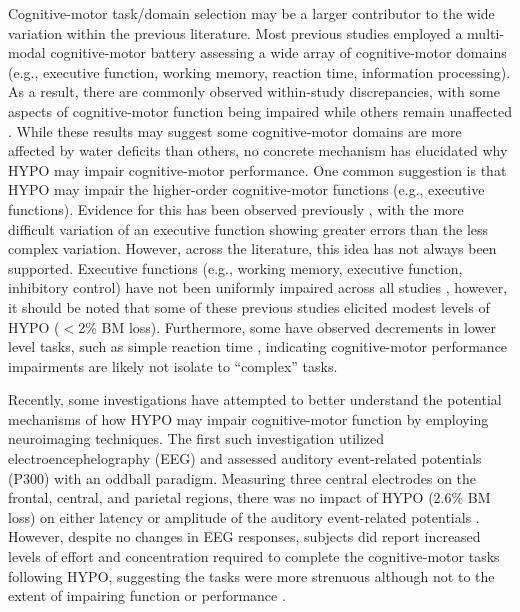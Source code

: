 Cognitive-motor task/domain selection may be a larger contributor to the wide variation within the previous literature. Most previous studies employed a multi-modal cognitive-motor battery assessing a wide array of cognitive-motor domains (e.g., executive function, working memory, reaction time, information processing). As a result, there are commonly observed within-study discrepancies, with some aspects of cognitive-motor function being impaired while others remain unaffected \cite{ganio_mild_2011}. While these results may suggest some cognitive-motor domains are more affected by water deficits than others, no concrete mechanism has elucidated why HYPO may impair cognitive-motor performance. One common suggestion is that HYPO may impair the higher-order cognitive-motor functions (e.g., executive functions). Evidence for this has been observed previously \cite{tomporowski_effects_2007}, with the more difficult variation of an executive function showing greater errors than the less complex variation. However, across the literature, this idea has not always been supported. Executive functions (e.g., working memory, executive function, inhibitory control) have not been uniformly impaired across all studies \cite{wittbrodt_exercise-induced_2015,armstrong_mild_2012,danci_voluntary_2009,kakos_improving_2013,turner_mild_2017}, however, it should be noted that some of these previous studies elicited modest levels of HYPO ($<$2\% BM loss). Furthermore, some have observed decrements in lower level tasks, such as simple reaction time \cite{barroso_hydration_2014,mcmorris_heat_2006}, indicating cognitive-motor performance impairments are likely not isolate to ``complex'' tasks.

Recently, some investigations have attempted to better understand the potential mechanisms of how HYPO may impair cognitive-motor function by employing neuroimaging techniques. The first such investigation \cite{szinnai_effect_2005} utilized electroencephelography (EEG) and assessed auditory event-related potentials (P300) with an oddball paradigm. Measuring three central electrodes on the frontal, central, and parietal regions, there was no impact of HYPO (2.6\% BM loss) on either latency or amplitude of the auditory event-related potentials \cite{szinnai_effect_2005}. However, despite no changes in EEG responses, subjects did report increased levels of effort and concentration required to complete the cognitive-motor tasks following HYPO, suggesting the tasks were more strenuous although not to the extent of impairing function or performance \cite{szinnai_effect_2005}. 

